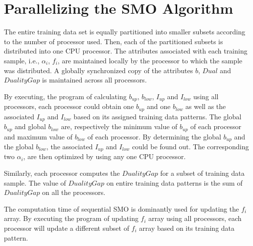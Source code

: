 \documentclass{article}
\begin{document}
	\section{Parallelizing the SMO Algorithm}
		
		The entire training data set is equally partitioned into smaller subsets according to the number of processor used. Then, each of the partitioned subsets is distributed into one CPU processor. The attributes associated with each training sample, i.e., $\alpha_i$, $f_i$, are maintained locally by the processor to which the sample was distributed. A globally synchronized copy of the attributes $b$, $Dual$ and $DualityGap$ is maintained across all processors.
		
		By executing, the program of calculating $b_{up}$, $b_{low}$, $I_{up}$ and $I_{low}$ using all processors, each processor could obtain one $b_{up}$ and one $b_{low}$ as well as the associated $I_{up}$ and $I_{low}$ based on its assigned training data patterns. The global $b_{up}$ and global $b_{low}$ are, respectively the minimum value of $b_{up}$ of each processor and maximum value of $b_{low}$ of each processor. By determining the global $b_{up}$ and the global $b_{low}$, the associated $I_{up}$ and $I_{low}$ could be found out. The corresponding two $\alpha_i$, are then optimized by using any one CPU processor.
		
		Similarly, each processor computes the $DualityGap$ for a subset of training data sample. The value of $DualityGap$ on entire training data patterns is the sum of $DualityGap$ on all the processors.
		
		The computation time of sequential SMO is dominantly used for updating the $f_i$ array. By executing the program of updating $f_i$ array using all processors, each processor will update a different subset of $f_i$ array based on its training data pattern.
		
\end{document}
